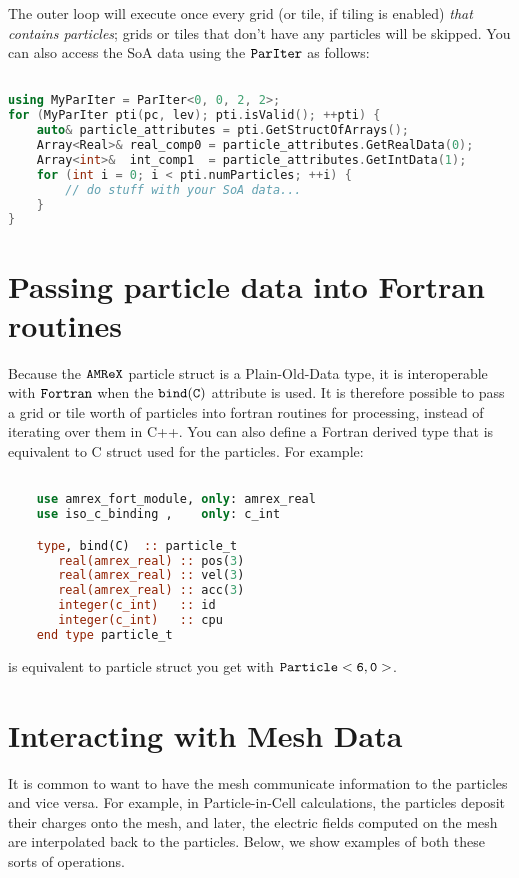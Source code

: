 The outer loop will execute once every grid (or tile, if tiling is enabled) \emph{that contains particles}; grids or tiles
that don't have any particles will be skipped. You can also access the SoA data using the $\tt{ParIter}$ as follows:

\begin{lstlisting}[language=cpp]

using MyParIter = ParIter<0, 0, 2, 2>;
for (MyParIter pti(pc, lev); pti.isValid(); ++pti) {
    auto& particle_attributes = pti.GetStructOfArrays();
    Array<Real>& real_comp0 = particle_attributes.GetRealData(0);
    Array<int>&  int_comp1  = particle_attributes.GetIntData(1);
    for (int i = 0; i < pti.numParticles; ++i) {
        // do stuff with your SoA data...
    }
}
\end{lstlisting}

\section{Passing particle data into Fortran routines}
\label{sec:Particles:Fortran}

Because the $\tt{AMReX}$ particle struct is a Plain-Old-Data type, it is interoperable with $\tt{Fortran}$ when the $\tt{bind(C)}$
attribute is used. It is therefore possible to pass a grid or tile worth of particles into fortran routines for processing,
instead of iterating over them in C++. You can also define a Fortran derived type that is equivalent to C struct used for the
particles. For example:

\begin{lstlisting}[language=fortran]

    use amrex_fort_module, only: amrex_real
    use iso_c_binding ,    only: c_int

    type, bind(C)  :: particle_t
       real(amrex_real) :: pos(3)
       real(amrex_real) :: vel(3)
       real(amrex_real) :: acc(3)
       integer(c_int)   :: id
       integer(c_int)   :: cpu
    end type particle_t

\end{lstlisting}

is equivalent to particle struct you get with $\tt{Particle<6, 0>}$.

\section{Interacting with Mesh Data}
\label{sec:Particles:Interacting}

It is common to want to have the mesh communicate information to the particles and vice versa. For example, in Particle-in-Cell calculations, the particles deposit their charges onto the mesh, and later, the electric fields computed on the mesh are interpolated back to the particles. Below, we show examples of both these sorts of operations.

